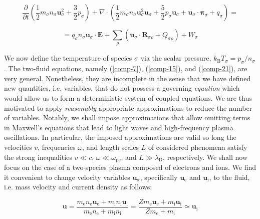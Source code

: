 \begin{equation*}
    \frac{\partial}{\partial t}\left(\frac{1}{2}m_\sigma n_\sigma \mathbf{u}_\sigma^2+\frac{3}{2}p_\sigma\right)+\nabla\cdot \left(\frac{1}{2}m_\sigma n_\sigma \mathbf{u}_\sigma^2 \mathbf{u}_\sigma + \frac{5}{2}p_\sigma \mathbf{u}_\sigma + \mathbf{u}_\sigma \cdot \boldsymbol{\pi}_\sigma + q_\sigma\right)=
\end{equation*}

\begin{equation}
    \label{comp-21}
    =q_\sigma n_\sigma \mathbf{u}_\sigma \cdot \mathbf{E} + \sum_{\rho}\left(\mathbf{u}_\sigma \cdot \mathbf{R}_{\sigma\rho} + Q_{\sigma \rho}\right) + W_\sigma 
\end{equation}

We now define the temperature of species $\sigma$ via the scalar pressure, $k_\text{B}T_\sigma = p_\sigma / n_\sigma$. The two-fluid equations, namely (\ref{comp-7}), (\ref{comp-15}), and (\ref{comp-21}), are very general. Nonetheless, they are incomplete in the sense that we have defined new quantities, i.e. variables, that do not possess a governing \textit{equation} which would allow us to form a deterministic system of coupled equations. We are thus motivated to apply \textit{reasonably} appropriate approximations to reduce the number of variables. Notably, we shall impose approximations that allow omitting terms in Maxwell's equations that lead to light waves and high-frequency plasma oscillations. In particular, the imposed approximations are valid so long the velocities $v$, frequencies $\omega$, and length scales $L$ of considered phenomena satisfy the strong inequalities $v\ll c$, $\omega \ll \omega_{\mathrm{pe}}$, and $L \gg \lambda_{\mathrm{D}}$, respectively. We shall now focus on the case of a two-species plasma composed of electrons and ions. We find it convenient to change velocity variables $\mathbf{u}_\sigma$, specifically $\mathbf{u}_{\mathrm{e}}$ and $\mathbf{u}_{\mathrm{i}}$, to the fluid, i.e. mass velocity and current density as follows:

\begin{equation*}
    \mathbf{u}=\frac{m_{\mathrm{e}}n_{\mathrm{e}}\mathbf{u}_{\mathrm{e}}+m_{\mathrm{i}}n_{\mathrm{i}}\mathbf{u}_{\mathrm{i}}}{m_{\mathrm{e}}n_{\mathrm{e}}+m_{\mathrm{i}}n_{\mathrm{i}}}=\frac{Zm_{\mathrm{e}}\mathbf{u}_{\mathrm{e}}+m_{\mathrm{i}}\mathbf{u}_{\mathrm{i}}}{Zm_{\mathrm{e}}+m_{\mathrm{i}}}\simeq \mathbf{u}_{\mathrm{i}}
\end{equation*}

